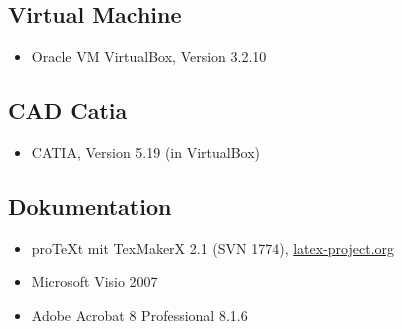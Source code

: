 \subsection*{Virtual Machine}\label{vm}
\begin{itemize}
	\item Oracle VM VirtualBox, Version 3.2.10
\end{itemize}

\subsection*{CAD Catia}\label{catia}
\begin{itemize}
	\item CATIA, Version 5.19 (in VirtualBox)
\end{itemize}

\subsection*{Dokumentation}\label{dokutools}
\begin{itemize}
	\item proTeXt mit TexMakerX 2.1 (SVN 1774), \href{http://www.latex-project.org/ftp.html}{latex-project.org}
	\item Microsoft Visio 2007
	\item Adobe Acrobat 8 Professional 8.1.6
\end{itemize}
